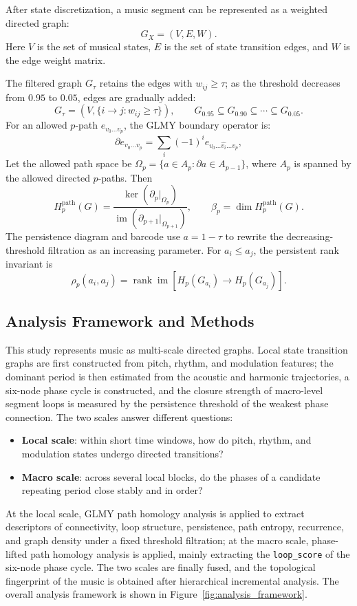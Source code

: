 \documentclass{article}
\begin{document}
After state discretization, a music segment can be represented as a weighted directed graph:
\[G_X=(V,E,W).\]
Here $V$ is the set of musical states, $E$ is the set of state transition edges, and $W$ is the edge weight matrix.

The filtered graph $G_\tau$ retains the edges with $w_{ij}\ge\tau$; as the threshold decreases from $0.95$ to $0.05$, edges are gradually added:
\[G_\tau=
\left(V,\{i\rightarrow j:w_{ij}\ge\tau\}\right), \qquad G_{0.95}\subseteq G_{0.90}\subseteq\cdots\subseteq G_{0.05}.\]
For an allowed $p$-path $e_{v_0\ldots v_p}$, the GLMY boundary operator is:
\[
\partial e_{v_0\ldots v_p}=\sum_i(-1)^i e_{v_0\ldots\widehat{v_i}\ldots v_p},\]
Let the allowed path space be $\Omega_p=\{a\in A_p:\partial a\in A_{p-1}\}$, where $A_p$ is spanned by the allowed directed $p$-paths. Then
\[H_p^{\mathrm{path}}(G)=\frac{\ker(\partial_p|_{\Omega_p})}{\operatorname{im}(\partial_{p+1}|_{\Omega_{p+1}})}, \qquad \beta_p=\dim H_p^{\mathrm{path}}(G).
\]
The persistence diagram and barcode use $a=1-\tau$ to rewrite the decreasing-threshold filtration as an increasing parameter. For $a_i \le a_j$, the persistent rank invariant is
$$
\rho_p(a_i,a_j)=\operatorname{rank}\operatorname{im}
\left[H_p(G_{a_i})\longrightarrow H_p(G_{a_j})\right].
$$

\subsection{Analysis Framework and Methods}

This study represents music as multi-scale directed graphs. Local state transition graphs are first constructed from pitch, rhythm, and modulation features; the dominant period is then estimated from the acoustic and harmonic trajectories, a six-node phase cycle is constructed, and the closure strength of macro-level segment loops is measured by the persistence threshold of the weakest phase connection. The two scales answer different questions:
\begin{itemize}
  \item \textbf{Local scale}: within short time windows, how do pitch, rhythm, and modulation states undergo directed transitions?
  \item \textbf{Macro scale}: across several local blocks, do the phases of a candidate repeating period close stably and in order?
\end{itemize}
At the local scale, GLMY path homology analysis is applied to extract descriptors of connectivity, loop structure, persistence, path entropy, recurrence, and graph density under a fixed threshold filtration; at the macro scale, phase-lifted path homology analysis is applied, mainly extracting the \verb|loop_score| of the six-node phase cycle. The two scales are finally fused, and the topological fingerprint of the music is obtained after hierarchical incremental analysis. The overall analysis framework is shown in Figure~\ref{fig:analysis_framework}.
\end{document}
